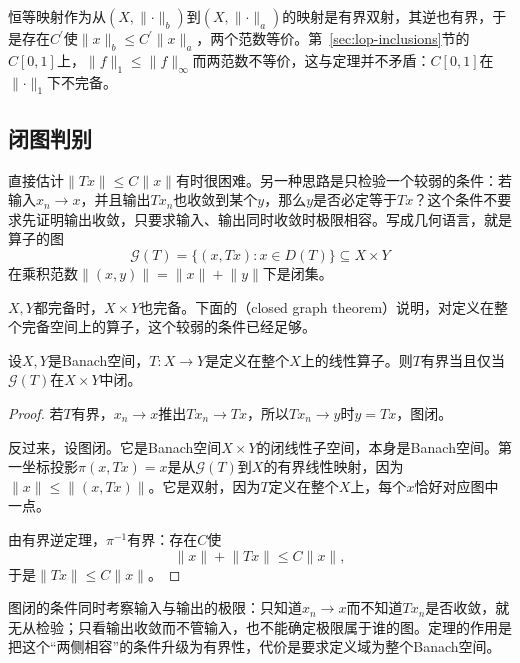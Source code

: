 恒等映射作为从$(X,\lVert\cdot\rVert_b)$到$(X,\lVert\cdot\rVert_a)$的映射是有界双射，其逆也有界，于是存在$C^\prime$使$\lVert x\rVert_b\leq C^\prime\lVert x\rVert_a$，两个范数等价。第~\ref{sec:lop-inclusions}节的$C[0,1]$上，$\lVert f\rVert_1\leq\lVert f\rVert_\infty$而两范数不等价，这与定理并不矛盾：$C[0,1]$在$\lVert\cdot\rVert_1$下不完备。

\subsection{闭图判别}
\label{sec:lop-closed-graph}

直接估计$\lVert Tx\rVert\leq C\lVert x\rVert$有时很困难。另一种思路是只检验一个较弱的条件：若输入$x_n\to x$，并且输出$Tx_n$也收敛到某个$y$，那么$y$是否必定等于$Tx$？这个条件不要求先证明输出收敛，只要求输入、输出同时收敛时极限相容。写成几何语言，就是算子的图
\begin{equation}
 \mathcal G(T)=\{(x,Tx):x\in D(T)\}\subseteq X\times Y
 \label{eq:lop-graph}
\end{equation}
在乘积范数$\lVert(x,y)\rVert=\lVert x\rVert+\lVert y\rVert$下是闭集。

$X,Y$都完备时，$X\times Y$也完备。下面的（closed graph theorem）说明，对定义在整个完备空间上的算子，这个较弱的条件已经足够。

\begin{theorem}[闭图定理]
\label{thm:lop-closed-graph}
设$X,Y$是Banach空间，$T:X\to Y$是定义在整个$X$上的线性算子。则$T$有界当且仅当$\mathcal G(T)$在$X\times Y$中闭。
\end{theorem}

\begin{proof}
若$T$有界，$x_n\to x$推出$Tx_n\to Tx$，所以$Tx_n\to y$时$y=Tx$，图闭。

反过来，设图闭。它是Banach空间$X\times Y$的闭线性子空间，本身是Banach空间。第一坐标投影$\pi(x,Tx)=x$是从$\mathcal G(T)$到$X$的有界线性映射，因为$\lVert x\rVert\leq\lVert(x,Tx)\rVert$。它是双射，因为$T$定义在整个$X$上，每个$x$恰好对应图中一点。

由有界逆定理，$\pi^{-1}$有界：存在$C$使
\[
 \lVert x\rVert+\lVert Tx\rVert\leq C\lVert x\rVert,
\]
于是$\lVert Tx\rVert\leq C\lVert x\rVert$。
\end{proof}

图闭的条件同时考察输入与输出的极限：只知道$x_n\to x$而不知道$Tx_n$是否收敛，就无从检验；只看输出收敛而不管输入，也不能确定极限属于谁的图。定理的作用是把这个“两侧相容”的条件升级为有界性，代价是要求定义域为整个Banach空间。

